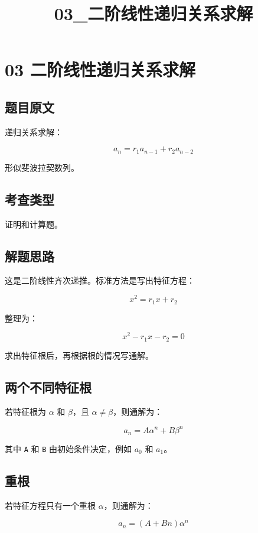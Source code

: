 \documentclass[UTF8,zihao=-4]{ctexart}
\title{03\_二阶线性递归关系求解}
\author{}
\date{}
\begin{document}
\maketitle

\section*{03 二阶线性递归关系求解}

\subsection*{题目原文}

递归关系求解：

\[a_{n} = r_{1} a_{n-1} + r_{2} a_{n-2}\]

形似斐波拉契数列。

\subsection*{考查类型}

证明和计算题。

\subsection*{解题思路}

这是二阶线性齐次递推。标准方法是写出特征方程：

\[x^{2} = r_{1} x + r_{2}\]

整理为：

\[x^{2} - r_{1} x - r_{2} = 0\]

求出特征根后，再根据根的情况写通解。

\subsection*{两个不同特征根}

若特征根为 $\alpha$ 和 $\beta$，且 $\alpha \ne \beta$，则通解为：

\[a_{n} = A \alpha^{n} + B \beta^{n}\]

其中 \texttt{A} 和 \texttt{B} 由初始条件决定，例如 $a_0$ 和 $a_1$。

\subsection*{重根}

若特征方程只有一个重根 $\alpha$，则通解为：

\[a_{n} = (A + Bn) \alpha^{n}\]
\end{document}
